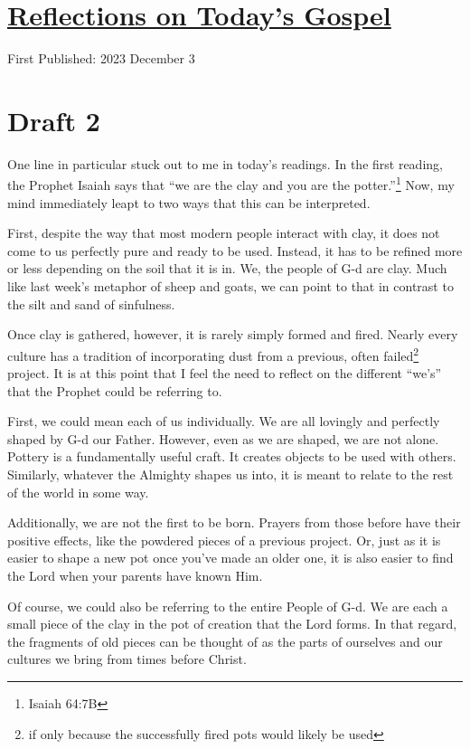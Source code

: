 \documentclass[12pt]{article}[titlepage]
\newcommand{\say}[1]{``#1''}
\newcommand{\1}{\={a}}
\newcommand{\2}{\={e}}
\newcommand{\3}{\={\i}}
\newcommand{\4}{\=o}
\newcommand{\5}{\=u}
\newcommand{\6}{\={A}}
\renewcommand{\,}{\textsuperscript{,}}
\begin{document}
\doublespacing
\section{\href{reflections-on-readings-1-advent-b-23.html}{Reflections on Today's Gospel}}
First Published: 2023 December 3

\section{Draft 2}
One line in particular stuck out to me in today's readings.
In the first reading, the Prophet Isaiah says that \say{we are the clay and you are the potter.}\footnote{Isaiah 64:7B}
Now, my mind immediately leapt to two ways that this can be interpreted.

First, despite the way that most modern people interact with clay, it does not come to us perfectly pure and ready to be used.
Instead, it has to be refined more or less depending on the soil that it is in.
We, the people of G-d are clay.
Much like last week's metaphor of sheep and goats, we can point to that in contrast to the silt and sand of sinfulness.

Once clay is gathered, however, it is rarely simply formed and fired.
Nearly every culture has a tradition of incorporating dust from a previous, often failed\footnote{if only because the successfully fired pots would likely be used} project.
It is at this point that I feel the need to reflect on the different \say{we's} that the Prophet could be referring to.

First, we could mean each of us individually.
We are all lovingly and perfectly shaped by G-d our Father.
However, even as we are shaped, we are not alone.
Pottery is a fundamentally useful craft.
It creates objects to be used with others.
Similarly, whatever the Almighty shapes us into, it is meant to relate to the rest of the world in some way.

Additionally, we are not the first to be born.
Prayers from those before have their positive effects, like the powdered pieces of a previous project.
Or, just as it is easier to shape a new pot once you've made an older one, it is also easier to find the Lord when your parents have known Him.

Of course, we could also be referring to the entire People of G-d.
We are each a small piece of the clay in the pot of creation that the Lord forms.
In that regard, the fragments of old pieces can be thought of as the parts of ourselves and our cultures we bring from times before Christ.
\end{document}

